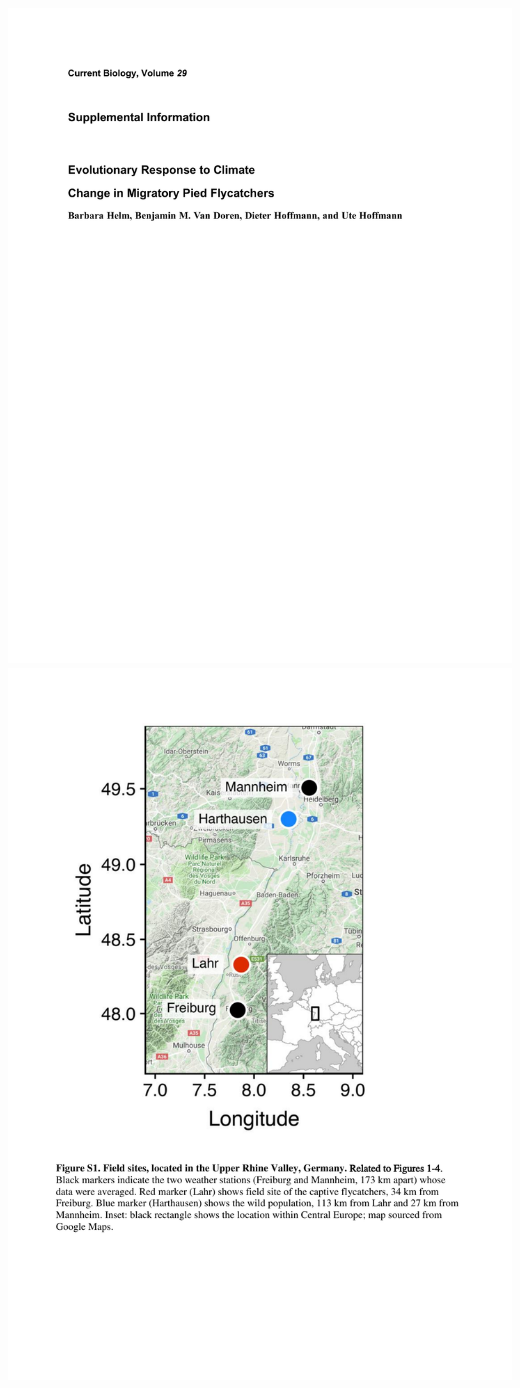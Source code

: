 \documentclass[a4paper, twoside]{templates/ociamthesis}
\begin{document}
\includegraphics[width=1\linewidth]{pdf_chapters/pied/pied_supp_crop_Part1}
\includegraphics[width=1\linewidth]{pdf_chapters/pied/pied_supp_crop_Part2}
\end{document}

